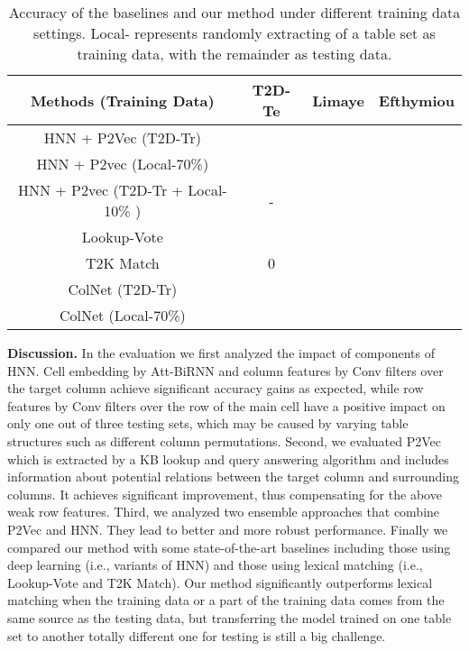 \documentclass{article}
\begin{document}
\vspace{-0.2cm}
\begin{table}[h!]
\scriptsize{
\centering
\begin{tabular}[t]{c|c|c|c}
\hline
Methods (Training Data) & T2D-Te & Limaye & Efthymiou    \\\hline 
 HNN + P2Vec (T2D-Tr) &\multirow{2}{*}{} & &  \\
 HNN + P2vec (Local-70\%)   &  &&   \\
 HNN + P2vec (T2D-Tr + Local-10\% )    & - &  &   \\\hline
 Lookup-Vote  & & &  \\
 T2K Match & 0 &  &    \\\hline
 ColNet (T2D-Tr) & \multirow{2}{*}{} &  &    \\
 ColNet (Local-70\%) &  &  &    \\\hline
\end{tabular}
\vspace{-0.2cm}
\caption{\footnotesize
Accuracy of the baselines and our method under different training data settings. 
Local- represents
randomly extracting  of a table set as training data, with the remainder as testing data. 
}\label{res:baseline}
}
\end{table}
\vspace{-0.1cm}

\noindent \textbf{Discussion.}
In the evaluation we first analyzed the impact of components of HNN.
Cell embedding by Att-BiRNN and column features by 
Conv filters over the target column 
achieve significant accuracy gains as expected, 
while row features by Conv filters over the row of the main cell 
have a positive impact on only one out of three testing sets,
which may be caused by varying table structures such as different column permutations.
Second, we evaluated P2Vec which is extracted by a KB lookup and query answering algorithm and includes information about potential relations between the target column and surrounding columns.
It achieves significant improvement, thus compensating for the above weak row features.
Third, we analyzed two ensemble approaches that combine P2Vec and HNN. 
They lead to better and more robust performance.
Finally we compared our method with some state-of-the-art baselines including those using deep learning (i.e., variants of HNN) and those using lexical matching (i.e., Lookup-Vote and T2K Match).
Our method 
significantly outperforms lexical matching
when the training data or a part of the training data comes from the same source as the testing data, but transferring the model trained on one table set to another totally different one for testing is still a big challenge.
\end{document}
